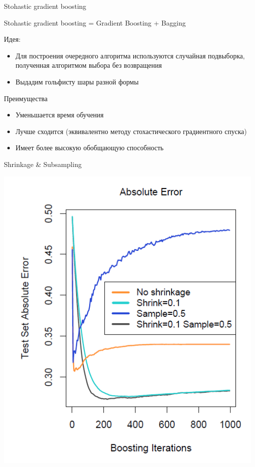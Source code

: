 \documentclass[10pt]{beamer}
\begin{document}
\begin{frame}{Stohastic gradient boosting}
\begin{center}
    Stohastic gradient boosting = Gradient Boosting + Bagging
\end{center}

\vspace{1em}
\begin{block}{Идея:}
\end{block}
\begin{itemize}
    \item Для построения очередного алгоритма используются случайная
        подвыборка, полученная алгоритмом выбора без возвращения
    \item Выдадим гольфисту шары разной формы
\end{itemize}

\vspace{1em}
\begin{block}{Преимущества}
\end{block}
\begin{itemize}
    \item Уменьшается время обучения
    \item Лучше сходится (эквивалентно методу стохастического градиентного
        спуска)
    \item Имеет более высокую обобщающую способность
\end{itemize}
\end{frame}

\begin{frame}{Shrinkage \& Subsampling}
\begin{center}
    \includegraphics[scale=0.4]{images/shrsub.png}
\end{center}
\end{frame}
\end{document}
